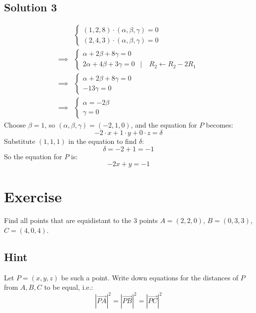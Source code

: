 \documentclass[a4paper,10pt]{article}
\begin{document}
\subsection{Solution 3}
\begin{align*}
             & \begin{cases}
                   (1, 2, 8) \cdot (\alpha, \beta, \gamma) = 0 \\
                   (2, 4, 3) \cdot (\alpha, \beta, \gamma) = 0
               \end{cases}                         \\
    \implies & \begin{cases}
                   \alpha + 2\beta +8\gamma = 0                                        \\
                   2\alpha + 4\beta + 3\gamma = 0 & | \quad R_2 \leftarrow R_2 - 2 R_1
               \end{cases} \\
    \implies & \begin{cases}
                   \alpha + 2\beta +8\gamma = 0 \\
                   -13\gamma = 0
               \end{cases}
    \\ \implies & \begin{cases}
        \alpha = -2\beta \\
        \gamma = 0
    \end{cases}
\end{align*}
Choose $\beta = 1$, so $(\alpha, \beta, \gamma) = (-2, 1, 0)$, and the equation for $P$ becomes:
\[
    -2\cdot x + 1\cdot y + 0\cdot z = \delta
\]
Substitute $(1, 1, 1)$ in the equation to find $\delta$:
\[
    \delta = -2 + 1 = -1
\]
So the equation for $P$ is:
\[
    -2x+y=-1
\]

\clearpage

\section{Exercise}

Find all points that are equidistant to the 3 points $A = (2, 2, 0)$, $B = (0, 3, 3)$, $C = (4, 0, 4)$.

\subsection{Hint}
Let $P=(x,y,z)$ be such a point. Write down equations for the distances of $P$ from $A,B,C$ to be equal, i.e.:
\[
    \left|\overrightarrow{PA}\right|^2 = \left|\overrightarrow{PB}\right|^2 = \left|\overrightarrow{PC}\right|^2
\]
\end{document}
